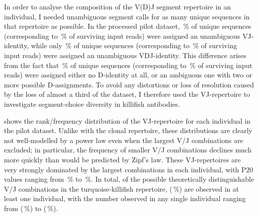 In order to analyse the composition of the V(D)J segment repertoire in an individual, I needed unambiguous segment calls for as many unique sequences in that repertoire as possible. In the processed pilot dataset, \,\% of unique sequences (corresponding to \,\% of surviving input reads) were assigned an unambiguous VJ-identity, while only \,\% of unique sequences (corresponding to \,\% of surviving input reads) were assigned an unambiguous VDJ-identity. This difference arises from the fact that \,\% of unique sequences (corresponding to \,\% of surviving input reads) were assigned either no D-identity at all, or an ambiguous one with two or more possible D-assignments. To avoid any distortions or loss of resolution caused by the loss of almost a third of the dataset, I therefore used the VJ-repertoire to investigate segment-choice diversity in killifish antibodies.

 shows the rank/frequency distribution of the VJ-repertoire for each individual in the pilot dataset. Unlike with the clonal repertoire, these distributions are clearly not well-modelled by a power law even when the largest V/J combinations are excluded; in particular, the frequency of smaller V/J combinations declines much more quickly than would be predicted by Zipf's law. These VJ-repertoires are very strongly dominated by the largest combinations in each individual, with P20 values ranging from \,\% to \,\%. In total, of the  possible theoretically distinguishable V/J combinations in the turquoise-killifish repertoire,  (\,\%) are observed in at least one individual, with the number observed in any single individual ranging from  (\,\%) to  (\,\%).

